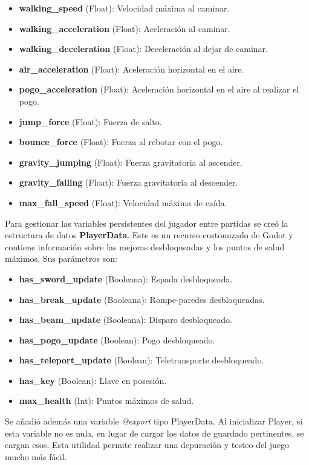 \begin{itemize}
    \item \textbf{walking\_speed} (Float): Velocidad máxima al caminar.
    \item \textbf{walking\_acceleration} (Float): Aceleración al caminar.
    \item \textbf{walking\_deceleration} (Float): Deceleración al dejar de caminar.
    \item \textbf{air\_acceleration} (Float): Aceleración horizontal en el aire.
    \item \textbf{pogo\_acceleration} (Float): Aceleración horizontal en el aire al realizar el pogo.
    \item \textbf{jump\_force} (Float): Fuerza de salto.
    \item \textbf{bounce\_force} (Float): Fuerza al rebotar con el pogo.
    \item \textbf{gravity\_jumping} (Float): Fuerza gravitatoria al ascender.
    \item \textbf{gravity\_falling} (Float): Fuerza gravitatoria al descender.
    \item \textbf{max\_fall\_speed} (Float): Velocidad máxima de caída.
\end{itemize}

Para gestionar las variables persistentes del jugador entre partidas se creó la estructura de datos \textbf{PlayerData}. Este es un recurso customizado de Godot y contiene información sobre las mejoras desbloqueadas y los puntos de salud máximos. Sus parámetros son:

\begin{itemize}
    \item \textbf{has\_sword\_update} (Booleana): Espada desbloqueada.
    \item \textbf{has\_break\_update} (Booleana): Rompe-paredes desbloqueadas.
    \item \textbf{has\_beam\_update} (Booleana): Disparo desbloqueado.
    \item \textbf{has\_pogo\_update} (Boolean): Pogo desbloqueado.
    \item \textbf{has\_teleport\_update} (Boolean): Teletransporte desbloqueado.
    \item \textbf{has\_key} (Boolean): Llave en posesión.
    \item \textbf{max\_health} (Int): Puntos máximos de salud.
\end{itemize}

Se añadió además una variable \textit{@export} tipo PlayerData. Al inicializar Player, si esta variable no es nula, en lugar de cargar los datos de guardado pertinentes, se cargan esos. Esta utilidad permite realizar una depuración y testeo del juego mucho más fácil.

